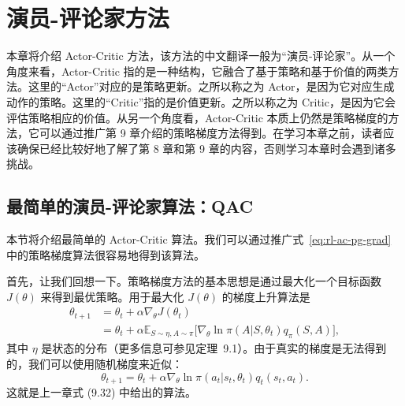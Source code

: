 \chapter{演员-评论家方法}
\label{ch:rl-ac}



本章将介绍 Actor-Critic 方法，该方法的中文翻译一般为“演员-评论家”。从一个角度来看，Actor-Critic 指的是一种结构，它融合了基于策略和基于价值的两类方法。这里的“Actor”对应的是策略更新。之所以称之为 Actor，是因为它对应生成动作的策略。这里的“Critic”指的是价值更新。之所以称之为 Critic，是因为它会评估策略相应的价值。从另一个角度看，Actor-Critic 本质上仍然是策略梯度的方法，它可以通过推广第 9 章介绍的策略梯度方法得到。在学习本章之前，读者应该确保已经比较好地了解了第 8 章和第 9 章的内容，否则学习本章时会遇到诸多挑战。

\section{最简单的演员-评论家算法：QAC}
\label{sec:rl-ac-qac}

本节将介绍最简单的 Actor-Critic 算法。我们可以通过推广式~\eqref{eq:rl-ac-pg-grad} 中的策略梯度算法很容易地得到该算法。

首先，让我们回想一下。策略梯度方法的基本思想是通过最大化一个目标函数 $J(\theta)$ 来得到最优策略。用于最大化 $J(\theta)$ 的梯度上升算法是
\begin{equation}
\begin{aligned}
\theta_{t+1} &= \theta_{t} + \alpha \nabla_{\theta} J(\theta_{t}) \\
&= \theta_{t} + \alpha \mathbb{E}_{S \sim \eta, A \sim \pi} \Big[ \nabla_{\theta} \ln \pi(A | S, \theta_{t}) q_{\pi}(S, A) \Big],
\end{aligned}
\label{eq:rl-ac-pg-grad}
\end{equation}
其中 $\eta$ 是状态的分布（更多信息可参见定理~9.1）。由于真实的梯度是无法得到的，我们可以使用随机梯度来近似：
\begin{equation}
\theta_{t+1} = \theta_{t} + \alpha \nabla_{\theta} \ln \pi(a_{t} | s_{t}, \theta_{t}) q_{t}(s_{t}, a_{t}).
\label{eq:rl-ac-sgd}
\end{equation}
这就是上一章式 (9.32) 中给出的算法。

